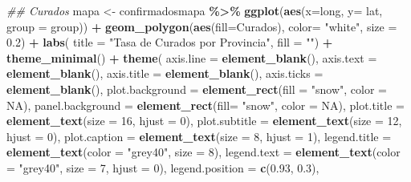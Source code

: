 \documentclass[
]{book}
\newenvironment{Shaded}{\begin{snugshade}}{\end{snugshade}}
\newcommand{\CommentTok}[1]{\textcolor[rgb]{0.56,0.35,0.01}{\textit{#1}}}
\newcommand{\DataTypeTok}[1]{\textcolor[rgb]{0.13,0.29,0.53}{#1}}
\newcommand{\DecValTok}[1]{\textcolor[rgb]{0.00,0.00,0.81}{#1}}
\newcommand{\FloatTok}[1]{\textcolor[rgb]{0.00,0.00,0.81}{#1}}
\newcommand{\KeywordTok}[1]{\textcolor[rgb]{0.13,0.29,0.53}{\textbf{#1}}}
\newcommand{\NormalTok}[1]{#1}
\newcommand{\OperatorTok}[1]{\textcolor[rgb]{0.81,0.36,0.00}{\textbf{#1}}}
\newcommand{\OtherTok}[1]{\textcolor[rgb]{0.56,0.35,0.01}{#1}}
\newcommand{\StringTok}[1]{\textcolor[rgb]{0.31,0.60,0.02}{#1}}
\begin{document}
\begin{Shaded}
\begin{Highlighting}[]
\CommentTok{\#\# Curados}
\NormalTok{mapa \textless{}{-}}\StringTok{ }\NormalTok{confirmadosmapa }\OperatorTok{\%\textgreater{}\%}
\StringTok{  }\KeywordTok{ggplot}\NormalTok{(}\KeywordTok{aes}\NormalTok{(}\DataTypeTok{x=}\NormalTok{long, }\DataTypeTok{y=}\NormalTok{ lat, }\DataTypeTok{group =}\NormalTok{ group)) }\OperatorTok{+}
\StringTok{  }\KeywordTok{geom\_polygon}\NormalTok{(}\KeywordTok{aes}\NormalTok{(}\DataTypeTok{fill=}\NormalTok{Curados), }\DataTypeTok{color=} \StringTok{"white"}\NormalTok{, }\DataTypeTok{size =} \FloatTok{0.2}\NormalTok{) }\OperatorTok{+}
\StringTok{  }\KeywordTok{labs}\NormalTok{( }\DataTypeTok{title =} \StringTok{"Tasa de Curados por Provincia"}\NormalTok{,}
        \DataTypeTok{fill =} \StringTok{""}\NormalTok{) }\OperatorTok{+}
\StringTok{  }\KeywordTok{theme\_minimal}\NormalTok{() }\OperatorTok{+}
\StringTok{  }\KeywordTok{theme}\NormalTok{(}
    \DataTypeTok{axis.line =} \KeywordTok{element\_blank}\NormalTok{(),}
    \DataTypeTok{axis.text =} \KeywordTok{element\_blank}\NormalTok{(),}
    \DataTypeTok{axis.title =} \KeywordTok{element\_blank}\NormalTok{(),}
    \DataTypeTok{axis.ticks =} \KeywordTok{element\_blank}\NormalTok{(),}
    \DataTypeTok{plot.background =} \KeywordTok{element\_rect}\NormalTok{(}\DataTypeTok{fill =} \StringTok{"snow"}\NormalTok{, }\DataTypeTok{color =} \OtherTok{NA}\NormalTok{),}
    \DataTypeTok{panel.background =} \KeywordTok{element\_rect}\NormalTok{(}\DataTypeTok{fill=} \StringTok{"snow"}\NormalTok{, }\DataTypeTok{color =} \OtherTok{NA}\NormalTok{),}
    \DataTypeTok{plot.title =} \KeywordTok{element\_text}\NormalTok{(}\DataTypeTok{size =} \DecValTok{16}\NormalTok{, }\DataTypeTok{hjust =} \DecValTok{0}\NormalTok{),}
    \DataTypeTok{plot.subtitle =} \KeywordTok{element\_text}\NormalTok{(}\DataTypeTok{size =} \DecValTok{12}\NormalTok{, }\DataTypeTok{hjust =} \DecValTok{0}\NormalTok{),}
    \DataTypeTok{plot.caption =} \KeywordTok{element\_text}\NormalTok{(}\DataTypeTok{size =} \DecValTok{8}\NormalTok{, }\DataTypeTok{hjust =} \DecValTok{1}\NormalTok{),}
    \DataTypeTok{legend.title =} \KeywordTok{element\_text}\NormalTok{(}\DataTypeTok{color =} \StringTok{"grey40"}\NormalTok{, }\DataTypeTok{size =} \DecValTok{8}\NormalTok{),}
    \DataTypeTok{legend.text =} \KeywordTok{element\_text}\NormalTok{(}\DataTypeTok{color =} \StringTok{"grey40"}\NormalTok{, }\DataTypeTok{size =} \DecValTok{7}\NormalTok{, }\DataTypeTok{hjust =} \DecValTok{0}\NormalTok{),}
    \DataTypeTok{legend.position =} \KeywordTok{c}\NormalTok{(}\FloatTok{0.93}\NormalTok{, }\FloatTok{0.3}\NormalTok{),}

\end{Highlighting}
\end{Shaded}
\end{document}

